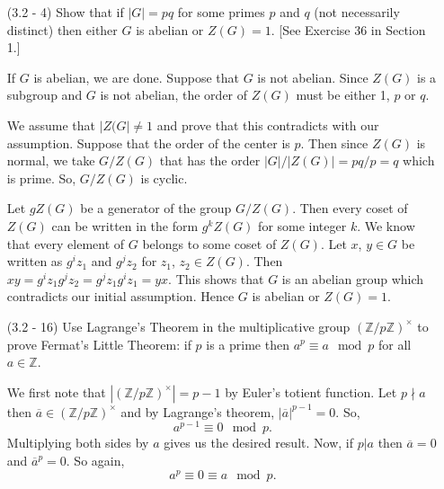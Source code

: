 \documentclass[12pt]{article}
\begin{document}
\begin{enumerate}
\begin{enumerate}
\end{enumerate}


\item[(3.2 - 4)] Show that if $|G|=pq$ for some primes
$p$ and $q$ (not necessarily distinct) then either
$G$ is abelian or $Z(G) = 1$. [See Exercise 36 in Section 1.]
\begin{mybox}
    
    If $G$ is abelian, we are done. Suppose that $G$ is not
    abelian. Since $Z(G)$ is a subgroup and $G$ is not
    abelian, the order of $Z(G)$ must be either 1, $p$
    or $q$.
    
    \vspace*{2mm}
    We assume that $|Z(G|\neq 1$ and prove that this
    contradicts with our assumption. Suppose that the
    order of the center is $p$. Then since $Z(G)$ is
    normal, we take $G/Z(G)$ that has the order
    $|G|/|Z(G)|=pq/p=q$ which is prime. So, $G/Z(G)$ is
    cyclic.

    \vspace*{2mm}
    Let $gZ(G)$ be a generator of the group $G/Z(G)$.
    Then every coset of $Z(G)$ can be written in the form
    $g^kZ(G)$ for some integer $k$.
    We know that every element of $G$ belongs
    to some coset of $Z(G)$. Let $x$, $y\in G$ be written
    as $g^iz_1$ and $g^jz_2$ for
    $z_1$, $z_2\in Z(G)$. Then
    $xy=g^iz_1g^jz_2=g^jz_1g^iz_1=yx$. This shows that
    $G$ is an abelian group which contradicts our initial
    assumption.
    Hence $G$ is abelian or $Z(G)=1$.
\end{mybox}


\item[(3.2 - 16)] Use Lagrange's Theorem in the multiplicative group $(\mathbb{Z}
/p\mathbb{Z})^\times$ to prove Fermat's Little Theorem:
if $p$ is a prime then $a^p \equiv a\mod{p}$ for all $a\in\mathbb{Z}$.
\begin{mybox}
    
    We first note that
    $|(\mathbb{Z}/p\mathbb{Z})^\times|=p-1$ by
    Euler's totient function.
    Let $p\nmid a$ then
    $\overline{a}\in (\mathbb{Z}/p\mathbb{Z})^\times$ and
    by Lagrange's theorem, $|\overline{a}|^{p-1}=0$. So,
    $$a^{p-1}\equiv 0\mod{p}.$$
    Multiplying both sides by $a$ gives us the desired
    result.
    Now, if $p|a$ then $\overline{a}=0$ and
    $\overline{a}^p=0$. So again,
    $$a^p\equiv 0\equiv a \mod{p}.$$
\end{mybox}
\end{enumerate}
\end{document}
